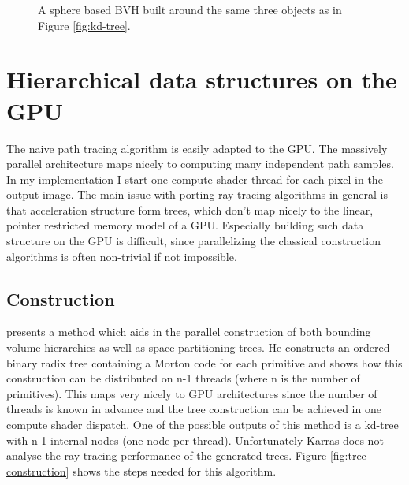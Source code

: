 \documentclass{ACGSeminar}
\begin{document}
\begin{figure}[htb!]
  \centering
  
  \caption{A sphere based BVH built around the same three objects as in Figure \ref{fig:kd-tree}.}
  \label{fig:bvh}
\end{figure}

\section{Hierarchical data structures on the GPU} \label{gpu-adapting}
The naive path tracing algorithm is easily adapted to the GPU. The massively parallel architecture maps nicely to computing many independent path samples. In my implementation I start one compute shader thread for each pixel in the output image. The main issue with porting ray tracing algorithms in general is that acceleration structure form trees, which don't map nicely to the linear, pointer restricted memory model of a GPU. Especially building such data structure on the GPU is difficult, since parallelizing the classical construction algorithms is often non-trivial if not impossible. \cite[1]{Karras:2012:MPC:2383795.2383801}
\subsection{Construction}
\citet{Karras:2012:MPC:2383795.2383801} presents a method which aids in the parallel construction of both bounding volume hierarchies as well as space partitioning trees. He constructs an ordered binary radix tree containing a Morton code for each primitive and shows how this construction can be distributed on n-1 threads (where n is the number of primitives). This maps very nicely to GPU architectures since the number of threads is known in advance and the tree construction can be achieved in one compute shader dispatch. One of the possible outputs of this method is a kd-tree with n-1 internal nodes (one node per thread). Unfortunately Karras does not analyse the ray tracing performance of the generated trees. Figure \ref{fig:tree-construction} shows the steps needed for this algorithm.
\end{document}
